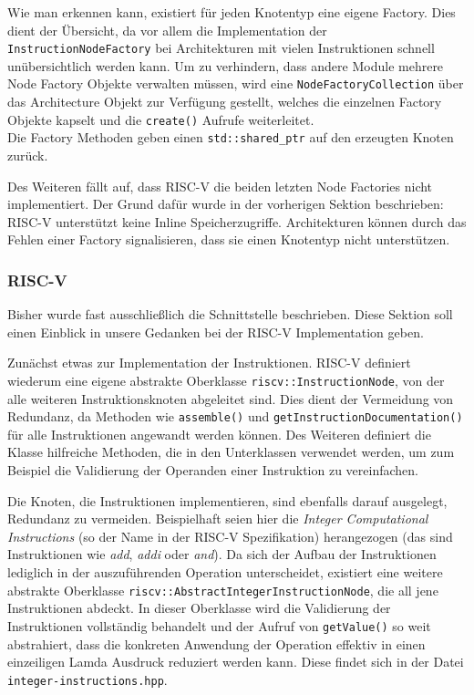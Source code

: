 Wie man erkennen kann, existiert für jeden Knotentyp eine eigene Factory. Dies
dient der Übersicht, da vor allem die Implementation der
\texttt{InstructionNodeFactory} bei Architekturen mit vielen Instruktionen
schnell unübersichtlich werden kann. Um zu verhindern, dass andere Module
mehrere Node Factory Objekte verwalten müssen, wird eine
\texttt{NodeFactoryCollection} über das Architecture Objekt zur Verfügung gestellt,
welches die einzelnen Factory Objekte kapselt und die \texttt{create()} Aufrufe
weiterleitet. \\
Die Factory Methoden geben einen \texttt{std::shared\_ptr} auf den erzeugten
Knoten zurück.

Des Weiteren fällt auf, dass RISC-V die beiden letzten Node Factories nicht
implementiert. Der Grund dafür wurde in der vorherigen Sektion beschrieben: RISC-V
unterstützt keine Inline Speicherzugriffe. Architekturen können durch das Fehlen
einer Factory signalisieren, dass sie einen Knotentyp nicht unterstützen.

\subsubsection{RISC-V}

Bisher wurde fast ausschließlich die Schnittstelle beschrieben. Diese Sektion soll
einen Einblick in unsere Gedanken bei der RISC-V Implementation geben.

Zunächst etwas zur Implementation der Instruktionen. RISC-V definiert wiederum
eine eigene abstrakte Oberklasse \texttt{riscv::InstructionNode}, von der alle
weiteren Instruktionsknoten abgeleitet sind. Dies dient der Vermeidung von
Redundanz, da Methoden wie \texttt{assemble()} und \texttt{getInstructionDocumentation()}
für alle Instruktionen angewandt werden können. Des Weiteren definiert die Klasse
hilfreiche Methoden, die in den Unterklassen verwendet werden, um zum Beispiel
die Validierung der Operanden einer Instruktion zu vereinfachen.

Die Knoten, die Instruktionen implementieren, sind ebenfalls darauf ausgelegt,
Redundanz zu vermeiden. Beispielhaft seien hier die \textit{Integer Computational
Instructions} (so der Name in der RISC-V Spezifikation) herangezogen (das sind
Instruktionen wie \textit{add}, \textit{addi} oder \textit{and}). Da sich der
Aufbau der Instruktionen lediglich in der auszuführenden Operation unterscheidet,
existiert eine weitere abstrakte Oberklasse \texttt{riscv::AbstractIntegerInstructionNode},
die all jene Instruktionen abdeckt. In dieser Oberklasse wird die Validierung
der Instruktionen vollständig behandelt und der Aufruf von \texttt{getValue()}
so weit abstrahiert, dass die konkreten Anwendung der Operation effektiv in einen
einzeiligen Lamda Ausdruck reduziert werden kann. Diese findet sich in der Datei
\texttt{integer-instructions.hpp}.

